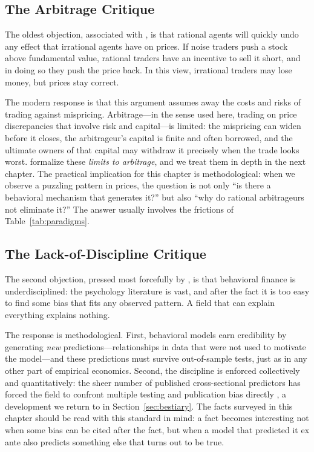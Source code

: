 \subsection{The Arbitrage Critique}

The oldest objection, associated with \citet{friedman1953}, is that rational agents will quickly undo any effect that irrational agents have on prices. If noise traders push a stock above fundamental value, rational traders have an incentive to sell it short, and in doing so they push the price back. In this view, irrational traders may lose money, but prices stay correct.

The modern response is that this argument assumes away the costs and risks of trading against mispricing. Arbitrage---in the sense used here, trading on price discrepancies that involve risk and capital---is limited: the mispricing can widen before it closes, the arbitrageur's capital is finite and often borrowed, and the ultimate owners of that capital may withdraw it precisely when the trade looks worst. \citet{shleifer1997} formalize these \emph{limits to arbitrage}, and we treat them in depth in the next chapter. The practical implication for this chapter is methodological: when we observe a puzzling pattern in prices, the question is not only ``is there a behavioral mechanism that generates it?'' but also ``why do rational arbitrageurs not eliminate it?'' The answer usually involves the frictions of Table~\ref{tab:paradigms}.

\subsection{The Lack-of-Discipline Critique}

The second objection, pressed most forcefully by \citet{fama1998}, is that behavioral finance is underdisciplined: the psychology literature is vast, and after the fact it is too easy to find some bias that fits any observed pattern. A field that can explain everything explains nothing.

The response is methodological. First, behavioral models earn credibility by generating \emph{new} predictions---relationships in data that were not used to motivate the model---and these predictions must survive out-of-sample tests, just as in any other part of empirical economics. Second, the discipline is enforced collectively and quantitatively: the sheer number of published cross-sectional predictors has forced the field to confront multiple testing and publication bias directly \citep{harvey2016,mclean2016,hou2020}, a development we return to in Section~\ref{sec:bestiary}. The facts surveyed in this chapter should be read with this standard in mind: a fact becomes interesting not when some bias can be cited after the fact, but when a model that predicted it ex ante also predicts something else that turns out to be true.

